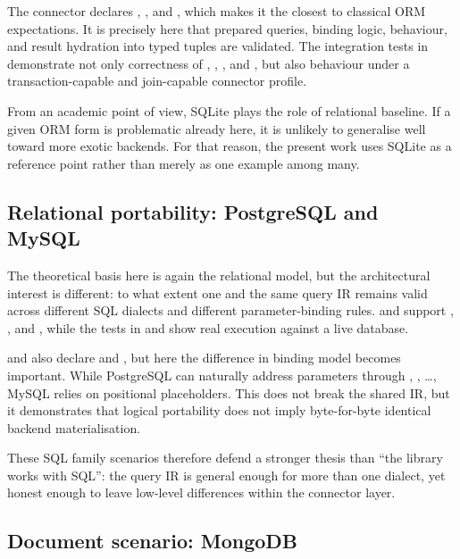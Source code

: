 The connector declares , , and , which makes it the closest to classical ORM expectations. It is precisely here that prepared queries, binding logic,  behaviour, and result hydration into typed tuples are validated. The integration tests in  demonstrate not only correctness of , , , and , but also behaviour under a transaction-capable and join-capable connector profile.

From an academic point of view, SQLite plays the role of relational baseline. If a given ORM form is problematic already here, it is unlikely to generalise well toward more exotic backends. For that reason, the present work uses SQLite as a reference point rather than merely as one example among many.

\subsection{Relational portability: PostgreSQL and MySQL}

The theoretical basis here is again the relational model, but the architectural interest is different: to what extent one and the same query IR remains valid across different SQL dialects and different parameter-binding rules.  and  support , , and , while the tests in  and  show real execution against a live database.

 and  also declare  and , but here the difference in binding model becomes important. While PostgreSQL can naturally address parameters through , , \ldots{}, MySQL relies on positional  placeholders. This does not break the shared IR, but it demonstrates that logical portability does not imply byte-for-byte identical backend materialisation.

These SQL family scenarios therefore defend a stronger thesis than ``the library works with SQL'': the query IR is general enough for more than one dialect, yet honest enough to leave low-level differences within the connector layer.

\subsection{Document scenario: MongoDB}

